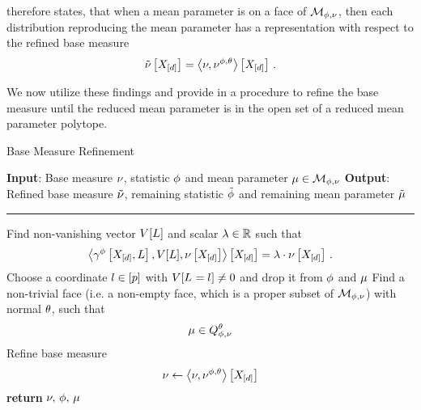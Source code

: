  therefore states, that when a mean parameter is on a face of $\mathcal{M}_{\phi,\nu}$, then each distribution reproducing the mean parameter has a representation with respect to the refined base measure
\begin{align*}
	\tilde{\nu}\left[X_{[d]}\right] = \left\langle \nu,\nu^{\phi,\theta}\right\rangle \left[ X_{[d]} \right] \, . 
\end{align*}

We now utilize these findings and provide in  a procedure to refine the base measure until the reduced mean parameter is in the open set of a reduced mean parameter polytope.

\begin{algorithm}[h!]\label{alg:baseMeasureRefinement}
\caption{Base Measure Refinement}
\begin{algorithmic}
\State \textbf{Input}: Base measure $\nu$, statistic $\phi$ and mean parameter $\mu\in\mathcal{M}_{\phi,\nu}$
\State \textbf{Output}: Refined base measure $\tilde{\nu}$, remaining statistic $\tilde{\phi}$ and remaining mean parameter $\tilde{\mu}$
\hrule
\While{$\meanparam\notin\sbinteriorof{\genmeanset}$}
		\State Find non-vanishing vector $V[L]$ and scalar $\lambda\in\mathbb{R}$ such that 
			\[ \left\langle \gamma^{\phi}\left[X_{[d]},L\right],V[L],\nu\left[X_{[d]}\right]\right\rangle \left[ X_{[d]} \right] = \lambda\cdot\nu\left[X_{[d]}\right] \, . \]
		\State Choose a coordinate $l\in[p]$ with $V[L_{}=l_{}]\neq0$ and drop it from $\phi$ and $\mu$
	\EndWhile
	\State Find a non-trivial face (i.e. a non-empty face, which is a proper subset of $\mathcal{M}_{\phi,\nu}$) with normal $\theta$, such that
		\[ \mu\in Q^{\theta}_{\phi,\nu} \]
	\State Refine base measure
		\[ \nu \leftarrow \left\langle \nu,\nu^{\phi,\theta}\right\rangle \left[ X_{[d]} \right] \]
\EndWhile
\State \textbf{return} $\nu, \, \phi,\,\mu$
\end{algorithmic}
\end{algorithm}

